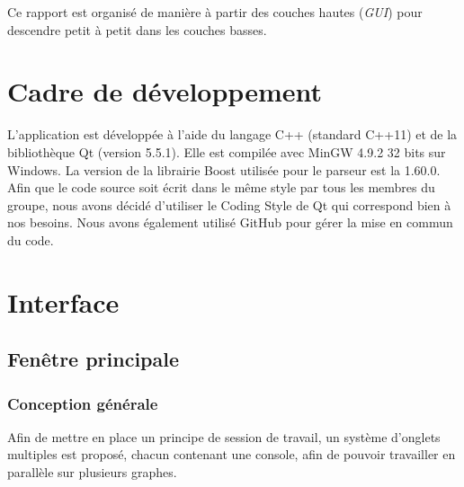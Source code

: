\documentclass[french]{article}
\begin{document}
		Ce rapport est organisé de manière à partir des couches hautes (\textit{GUI}) pour descendre petit à petit dans les couches basses.
	
	\section{Cadre de développement} 
		L'application est développée à l'aide du langage C++ (standard C++11) et de la bibliothèque Qt (version 5.5.1). Elle est compilée avec MinGW 4.9.2 32 bits sur Windows. La version de la librairie Boost utilisée pour le parseur est la 1.60.0. Afin que le code source soit écrit dans le même style par tous les membres du groupe, nous avons décidé d'utiliser le Coding Style de Qt \cite{qtStyle} qui correspond bien à nos besoins. Nous avons également utilisé GitHub pour gérer la mise en commun du code.
			
	\section{Interface}
	\subsection{Fenêtre principale}
	\subsubsection{Conception générale}
	Afin de mettre en place un principe de session de travail, un système d'onglets multiples est proposé, chacun contenant une console, afin de pouvoir travailler en parallèle sur plusieurs graphes.
\end{document}
